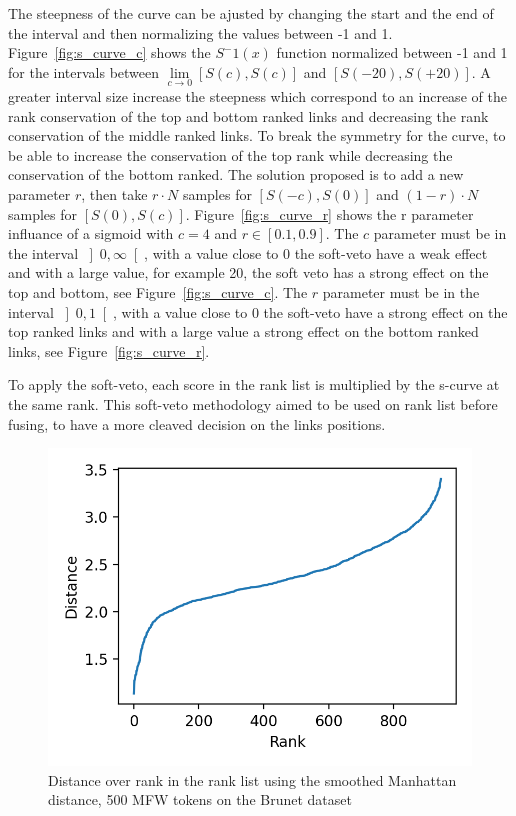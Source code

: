 The steepness of the curve can be ajusted by changing the start and the end of the interval and then normalizing the values between -1 and 1.
Figure~\ref{fig:s_curve_c} shows the $S^-1(x)$ function normalized between -1 and 1 for the intervals between $\lim\limits_{c \rightarrow 0} \left[S(c), S(c)\right]$ and $\left[S(-20), S(+20)\right]$.
A greater interval size increase the steepness which correspond to an increase of the rank conservation of the top and bottom ranked links and decreasing the rank conservation of the middle ranked links.
To break the symmetry for the curve, to be able to increase the conservation of the top rank while decreasing the conservation of the bottom ranked.
The solution proposed is to add a new parameter $r$, then take $r \cdot N$ samples for $\left[S(-c), S(0)\right]$ and $(1-r) \cdot N$ samples for $\left[S(0), S(c)\right]$.
Figure~\ref{fig:s_curve_r} shows the r parameter influance of a sigmoid with $c = 4$ and $r \in \left[0.1, 0.9\right]$.
The $c$ parameter must be in the interval $\left]0, \infty\right[$, with a value close to $0$ the soft-veto have a weak effect and with a large value, for example 20, the soft veto has a strong effect on the top and bottom, see Figure~\ref{fig:s_curve_c}.
The $r$ parameter must be in the interval $\left]0, 1\right[$, with a value close to $0$ the soft-veto have a strong effect on the top ranked links and with a large value a strong effect on the bottom ranked links, see Figure~\ref{fig:s_curve_r}.

To apply the soft-veto, each score in the rank list is multiplied by the s-curve at the same rank.
This soft-veto methodology aimed to be used on rank list before fusing, to have a more cleaved decision on the links positions.

\begin{figure}
  \centering
  \caption{Distance over rank in the rank list using the smoothed Manhattan distance, 500 MFW tokens on the Brunet dataset}
  \label{fig:distance_over_rank}
  \includegraphics[width=\linewidth]{img/distance_over_rank.png}
\end{figure}


